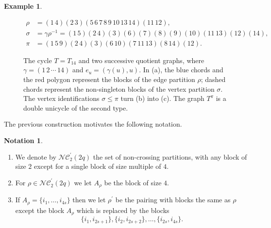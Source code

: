 \documentclass{article}
\theoremstyle{definition}
\newtheorem{notation}   [theorem]{Notation}
\newtheorem{example}    [theorem]{Example}
\newcommand{\NC}{\mathcal{NC}}
\begin{document}
{\begin{example}
\begin{figure}[p]

{\small
\[
\begin{aligned}
\rho
  &=(1\,4)(2\,3)
    (5\,6\,7\,8\,9\,10\,13\,14)(11\,12),\\
\sigma
  &=\gamma\rho^{-1}
    =(1\,5)(2\,4)(3)(6)(7)(8)(9)(10)
      (11\,13)(12)(14),\\
\pi
  &=(1\,5\,9)(2\,4)(3)(6\,10)
    (7\,11\,13)(8\,14)(12).
\end{aligned}
\]
}

\caption{
The cycle $T=T_{14}$ and two successive quotient graphs,
where $\gamma=(1\,2\,\cdots\,14)$ and
$e_u=(\gamma(u),u)$.
In (a), the blue chords and the red polygon represent
the blocks of the edge partition $\rho$;
dashed chords represent the non-singleton blocks
of the vertex partition $\sigma$.
The vertex identifications $\sigma\leq\pi$
turn (b) into (c).
The graph $T^\pi$ is a double unicycle of the second type.
}
\label{figure: double unicycle second type two}
\end{figure}
\end{example}

The previous construction motivates the following notation.


\begin{notation}
\begin{enumerate}
    \item We denote by $\NC_2^\prime(2q)$ the set of non-crossing partitions, with any block of size $2$ except for a single block of size multiple of $4$.
    \item For $\rho\in \NC_2^\prime(2q)$ we let $A_\rho$ be the block of size $4$.
    \item If $A_\rho=\{i_1,\dots,i_{4s}\}$ then we let $\rho^\prime$ be the pairing with blocks the same as $\rho$ except the block $A_\rho$ which is replaced by the blocks $$\{i_1,i_{2s+1}\},\{i_2,i_{2s+2}\},\dots,\{i_{2s},i_{4s}\}.$$
\end{enumerate} 
\end{notation}

}
\end{document}
